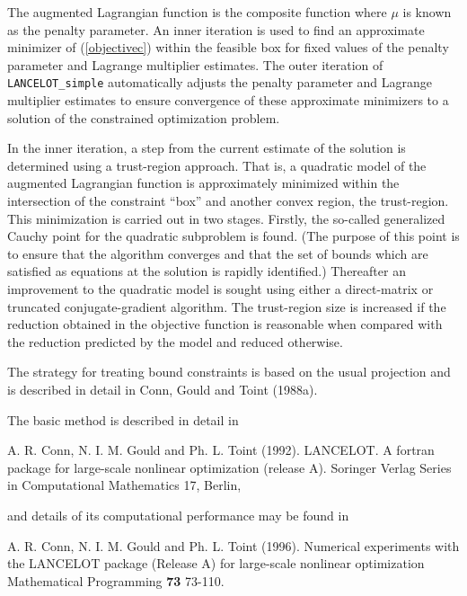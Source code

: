 \documentclass{galahad}
\newcommand{\packagename}{LANCELOT\_simple}
\newcommand{\calC}{{\cal C}}
\begin{document}
The augmented Lagrangian function is the composite function
\eqn{objectivec}{\phi( \bmx, \bmy, \mu ) = \ell( \bmx, \bmy) +
 \frac{1}{2 \mu} \sum_{i \in \calC} [c_i (\bmx)]^2,}
where $\mu$ is known as the penalty parameter.  An inner iteration is
used to find an approximate minimizer of (\ref{objectivec}) within the
feasible box for fixed values of the penalty parameter and Lagrange
multiplier estimates. The outer iteration of {\tt \packagename}
automatically adjusts the penalty parameter and Lagrange multiplier
estimates to ensure convergence of these approximate minimizers to a
solution of the constrained optimization problem.

In the inner iteration, a step from the current estimate of the solution
is determined using a trust-region approach.  That is, a quadratic model
of the augmented Lagrangian function is approximately minimized within
the intersection of the constraint ``box'' and another convex region,
the trust-region.  This minimization is carried out in two stages.
Firstly, the so-called generalized Cauchy point for the quadratic
subproblem is found.  (The purpose of this point is to ensure that the
algorithm converges and that the set of bounds which are satisfied as
equations at the solution is rapidly identified.)  Thereafter an
improvement to the quadratic model is sought using either a
direct-matrix or truncated conjugate-gradient algorithm. The
trust-region size is increased if the reduction obtained in the
objective function is reasonable when compared with the reduction
predicted by the model and reduced otherwise.

The strategy for treating bound constraints is based on the usual
projection and is described in detail in Conn, Gould and Toint (1988a).

\galreferences
\vspace*{1mm}

\noindent
The basic method is described in detail in
\vspace*{1mm}

\noindent
A. R. Conn, N. I. M. Gould and Ph. L. Toint (1992).
LANCELOT. A fortran package for large-scale nonlinear optimization
(release A). Soringer Verlag Series in Computational Mathematics 17,
Berlin,

\noindent
and details of its computational performance may be found in

\noindent
A. R. Conn, N. I. M. Gould and Ph. L. Toint (1996).
Numerical experiments with the {\sf LANCELOT} package
(Release A) for large-scale nonlinear optimization
Mathematical Programming {\bf 73} 73-110.
\end{document}
